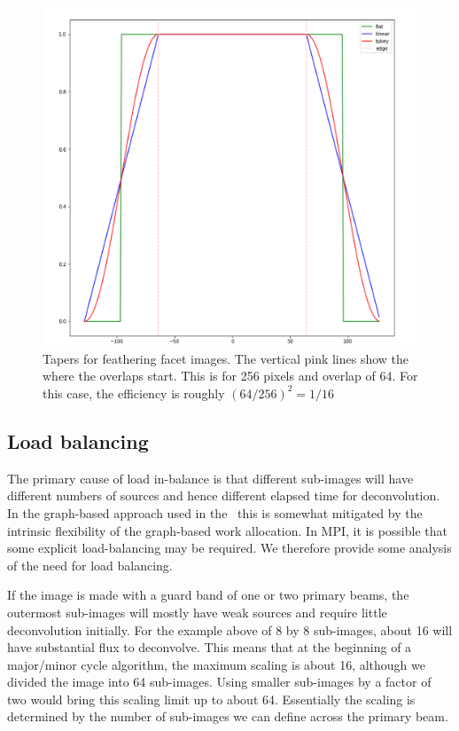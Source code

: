 \documentclass[11pt,a4paper,variablewidth]{article}
\begin{document}
\begin{figure}[htb]
  \centering
  \includegraphics[width=\textwidth]{./tapers.png}
  \caption{Tapers for feathering facet images. The vertical pink lines show the where the overlaps start. This is for 256 pixels and overlap of 64. For this case, the efficiency is roughly $(64/256)^2 = 1/16$}
  \label{fig:tapers}
\end{figure}

\subsection{Load balancing}

The primary cause of load in-balance is that different sub-images will have different numbers of sources and hence different elapsed time for deconvolution. In the graph-based approach used in the \ARL\ this is somewhat mitigated by the intrinsic flexibility of the graph-based work allocation. In MPI, it is possible that some explicit load-balancing may be required. We therefore provide some analysis of the need for load balancing.

If the image is made with a guard band of one or two primary beams, the outermost sub-images will mostly have weak sources and require little deconvolution initially. For the example above of 8 by 8 sub-images, about 16 will have substantial flux to deconvolve. This means that at the beginning of a major/minor cycle algorithm, the maximum scaling is about 16, although we divided the image into 64 sub-images. Using smaller sub-images by a factor of two would bring this scaling limit up to about 64. Essentially the scaling is determined by the number of sub-images we can define across the primary beam.
\end{document}
